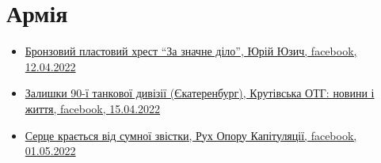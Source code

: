 
 
 
 
 
\section{Армія}



\begin{itemize} %

\item \hyperlink{12_04_2022.fb.juzych_jurij.1.plast_krest_nagrada}{%
Бронзовий пластовий хрест \enquote{За значне діло}, Юрій Юзич, facebook, 12.04.2022%
}

\item \hyperlink{15_04_2022.fb.krutivska_otg.1.zalyshky_divizii_ekaterinburg}{%
Залишки 90-ї танкової дивізії (Єкатеренбург), Крутівська ОТГ: новини і життя, %
facebook, 15.04.2022%
}

\item \hyperlink{01_05_2022.fb.fb_group.ruh_oporu_kapituljacii.1.smert_ruslan_borovik}{%
Серце крається від сумної звістки, Рух Опору Капітуляції, facebook, 01.05.2022%
}
\end{itemize} %
